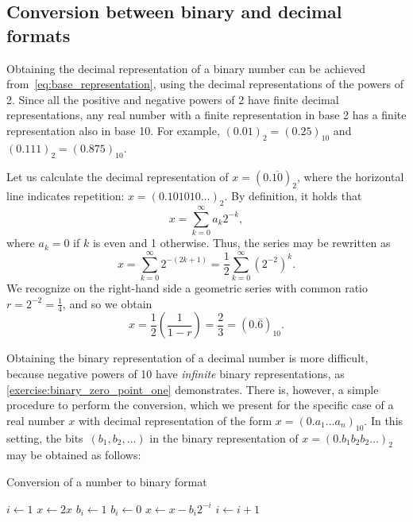 \subsection{Conversion between binary and decimal formats}%
Obtaining the decimal representation of a binary number can be achieved from~\eqref{eq:base_representation},
using the decimal representations of the powers of 2.
Since all the positive and negative powers of 2 have finite decimal representations,
any real number with a finite representation in base 2 has a finite representation also in base 10.
For example, $(0.01)_2 = (0.25)_{10}$ and $(0.111)_2 = (0.875)_{10}$.
\begin{example}
    \label{example:converting_binary_to_decimal}
    Let us calculate the decimal representation of $x = (0.\overline{10})_2$,
    where the horizontal line indicates repetition: $x = (0.101010\dots)_2$.
    By definition, it holds that
    \[
        x = \sum_{k=0}^{\infty} a_k 2^{-k},
    \]
    where $a_k = 0$ if $k$ is even and 1 otherwise.
    Thus, the series may be rewritten as
    \[
        x = \sum_{k=0}^{\infty} 2^{-(2k+1)} = \frac{1}{2} \sum_{k=0}^{\infty} (2^{-2})^k.
    \]
    We recognize on the right-hand side a geometric series with common ratio $r = 2^{-2} = \frac{1}{4}$,
    and so we obtain
    \[
        x = \frac{1}{2} \left( \frac{1}{1-r} \right) = \frac{2}{3} = (0.\overline 6)_{10}.
    \]
\end{example}

Obtaining the binary representation of a decimal number is more difficult,
because negative powers of 10 have \emph{infinite} binary representations,
as \cref{exercise:binary_zero_point_one} demonstrates.
There is, however, a simple procedure to perform the conversion,
which we present for the specific case of a real number $x$ with decimal representation of the form $x = (0.a_1\dots a_n)_{10}$.
In this setting,
the bits~$(b_1, b_2, \dots)$ in the binary representation of $x = (0.b_1b_2b_2 \dots)_2$ may be obtained as follows:
\begin{algorithm}
\caption{Conversion of a number to binary format}%
\label{algo:conversion_to_binary}%
\begin{algorithmic}[1]
\State $i \gets 1$
    \State $x \gets 2x$%
    \label{line:after_while}
        \State $b_i \gets 1$
    \Else
        \State $b_i \gets 0$
    \EndIf
    \State $x \gets x - b_i 2^{-i}$
    \State $i \gets i+1$
\EndWhile
\end{algorithmic}
\end{algorithm}

